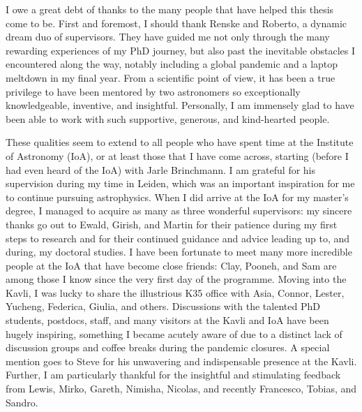 
\begin{acknowledgements}      
    
    I owe a great debt of thanks to the many people that have helped this thesis come to be. First and foremost, I should thank Renske and Roberto, a dynamic dream duo of supervisors. They have guided me not only through the many rewarding experiences of my PhD journey, but also past the inevitable obstacles I encountered along the way, notably including a global pandemic and a laptop meltdown in my final year. From a scientific point of view, it has been a true privilege to have been mentored by two astronomers so exceptionally knowledgeable, inventive, and insightful. Personally, I am immensely glad to have been able to work with such supportive, generous, and kind-hearted people.
    
    These qualities seem to extend to all people who have spent time at the Institute of Astronomy (IoA), or at least those that I have come across, starting (before I had even heard of the IoA) with Jarle Brinchmann. I am grateful for his supervision during my time in Leiden, which was an important inspiration for me to continue pursuing astrophysics. When I did arrive at the IoA for my master's degree, I managed to acquire as many as three wonderful supervisors: my sincere thanks go out to Ewald, Girish, and Martin for their patience during my first steps to research and for their continued guidance and advice leading up to, and during, my doctoral studies. I have been fortunate to meet many more incredible people at the IoA that have become close friends: Clay, Pooneh, and Sam are among those I know since the very first day of the programme. Moving into the Kavli, I was lucky to share the illustrious K35 office with Asia, Connor, Lester, Yucheng, Federica, Giulia, and others. Discussions with the talented PhD students, postdocs, staff, and many visitors at the Kavli and IoA have been hugely inspiring, something I became acutely aware of due to a distinct lack of discussion groups and coffee breaks during the pandemic closures. A special mention goes to Steve for his unwavering and indispensable presence at the Kavli. Further, I am particularly thankful for the insightful and stimulating feedback from Lewis, Mirko, Gareth, Nimisha, Nicolas, and recently Francesco, Tobias, and Sandro.
    

\end{acknowledgements}
